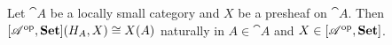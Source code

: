  Let $\cat A$ be a locally small category and $X$ be a presheaf on $\cat A$. Then 
$[\mathscr{A}^{\operatorname{op}}, \operatorname{\mathbf{Set}}](H_A, X) \cong X(A)$
naturally in $A \in \cat A$ and $X \in [\mathscr{A}^{\operatorname{op}},\operatorname{\mathbf{Set}}]$.